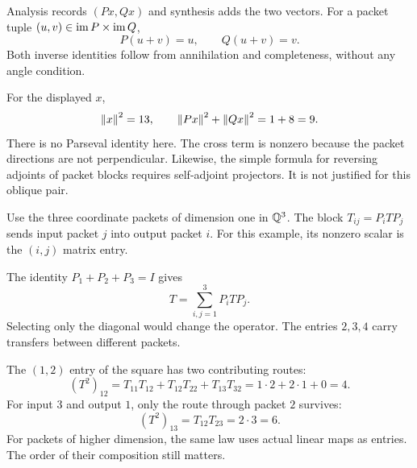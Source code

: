 
Analysis records $(Px,Qx)$ and synthesis adds the two vectors. For a packet tuple $(u,v)\in\operatorname{im} P\times\operatorname{im} Q$,
\[
P(u+v)=u,\qquad Q(u+v)=v.
\]
Both inverse identities follow from annihilation and completeness, without any angle condition.

For the displayed $x$,
\[
\left\lVert x\right\rVert^2=13,\qquad \left\lVert Px\right\rVert^2+\left\lVert Qx\right\rVert^2=1+8=9.
\]
There is no Parseval identity here. The cross term is nonzero because the packet directions are not perpendicular. Likewise, the simple formula for reversing adjoints of packet blocks requires self-adjoint projectors. It is not justified for this oblique pair.


Use the three coordinate packets of dimension one in $\mathbb Q^3$. The block $T_{ij}=P_iTP_j$ sends input packet $j$ into output packet $i$. For this example, its nonzero scalar is the $(i,j)$ matrix entry.


The identity $P_1+P_2+P_3=I$ gives
\[
T=\sum_{i,j=1}^3 P_iTP_j.
\]
Selecting only the diagonal would change the operator. The entries $2,3,4$ carry transfers between different packets.

The $(1,2)$ entry of the square has two contributing routes:
\[
(T^2)_{12}=T_{11}T_{12}+T_{12}T_{22}+T_{13}T_{32}
=1\cdot2+2\cdot1+0=4.
\]
For input $3$ and output $1$, only the route through packet $2$ survives:
\[
(T^2)_{13}=T_{12}T_{23}=2\cdot3=6.
\]
For packets of higher dimension, the same law uses actual linear maps as entries. The order of their composition still matters.


